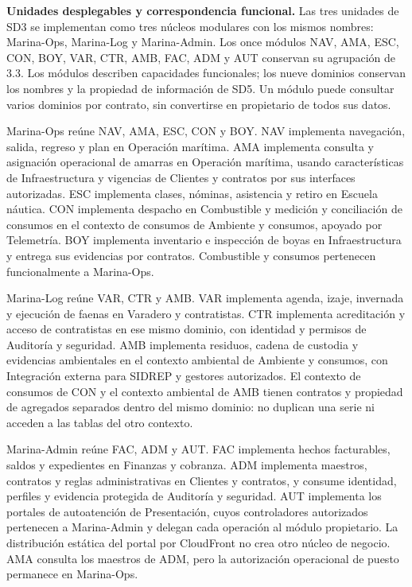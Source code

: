 \textbf{Unidades desplegables y correspondencia funcional.} Las tres unidades de SD3 se implementan como tres núcleos modulares con los mismos nombres: Marina-Ops, Marina-Log y Marina-Admin. Los once módulos NAV, AMA, ESC, CON, BOY, VAR, CTR, AMB, FAC, ADM y AUT conservan su agrupación de 3.3. Los módulos describen capacidades funcionales; los nueve dominios conservan los nombres y la propiedad de información de SD5. Un módulo puede consultar varios dominios por contrato, sin convertirse en propietario de todos sus datos.

Marina-Ops reúne NAV, AMA, ESC, CON y BOY. NAV implementa navegación, salida, regreso y plan en Operación marítima. AMA implementa consulta y asignación operacional de amarras en Operación marítima, usando características de Infraestructura y vigencias de Clientes y contratos por sus interfaces autorizadas. ESC implementa clases, nóminas, asistencia y retiro en Escuela náutica. CON implementa despacho en Combustible y medición y conciliación de consumos en el contexto de consumos de Ambiente y consumos, apoyado por Telemetría. BOY implementa inventario e inspección de boyas en Infraestructura y entrega sus evidencias por contratos. Combustible y consumos pertenecen funcionalmente a Marina-Ops.

Marina-Log reúne VAR, CTR y AMB. VAR implementa agenda, izaje, invernada y ejecución de faenas en Varadero y contratistas. CTR implementa acreditación y acceso de contratistas en ese mismo dominio, con identidad y permisos de Auditoría y seguridad. AMB implementa residuos, cadena de custodia y evidencias ambientales en el contexto ambiental de Ambiente y consumos, con Integración externa para SIDREP y gestores autorizados. El contexto de consumos de CON y el contexto ambiental de AMB tienen contratos y propiedad de agregados separados dentro del mismo dominio: no duplican una serie ni acceden a las tablas del otro contexto.

Marina-Admin reúne FAC, ADM y AUT. FAC implementa hechos facturables, saldos y expedientes en Finanzas y cobranza. ADM implementa maestros, contratos y reglas administrativas en Clientes y contratos, y consume identidad, perfiles y evidencia protegida de Auditoría y seguridad. AUT implementa los portales de autoatención de Presentación, cuyos controladores autorizados pertenecen a Marina-Admin y delegan cada operación al módulo propietario. La distribución estática del portal por CloudFront no crea otro núcleo de negocio. AMA consulta los maestros de ADM, pero la autorización operacional de puesto permanece en Marina-Ops.

